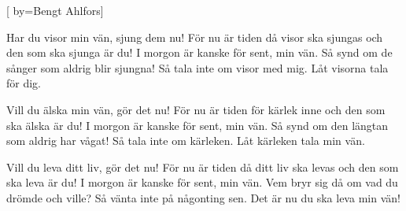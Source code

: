 


[ 	%
	by={Bengt Ahlfors}]		%
	
\beginverse*		%
Har du visor min vän, sjung dem nu!
För nu är tiden då visor ska sjungas
och den som ska sjunga är du!
I morgon är kanske för sent, min vän.
Så synd om de sånger som aldrig blir sjungna!
Så tala inte om visor med mig.
Låt visorna tala för dig. 
\endverse			%

\beginverse*		%
Vill du älska min vän, gör det nu!
För nu är tiden för kärlek inne
och den som ska älska är du!
I morgon är kanske för sent, min vän.
Så synd om den längtan som aldrig har vågat!
Så tala inte om kärleken.
Låt kärleken tala min vän. 
\endverse			%

\beginverse*		%
Vill du leva ditt liv, gör det nu!
För nu är tiden då ditt liv ska levas
och den som ska leva är du!
I morgon är kanske för sent, min vän.
Vem bryr sig då om vad du drömde och ville?
Så vänta inte på någonting sen.
Det är nu du ska leva min vän! 
\endverse			%


\endsong			%
